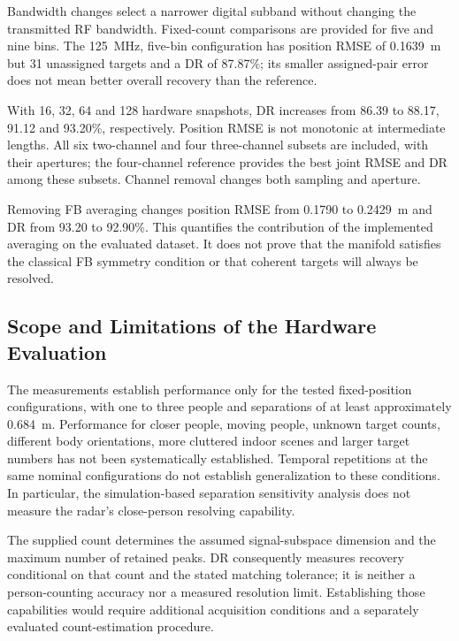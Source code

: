 Bandwidth changes select a narrower digital subband without changing the transmitted RF bandwidth. Fixed-count comparisons are provided for five and nine bins. The 125~MHz, five-bin configuration has position RMSE of 0.1639~m but 31 unassigned targets and a DR of 87.87\%; its smaller assigned-pair error does not mean better overall recovery than the reference.

With 16, 32, 64 and 128 hardware snapshots, DR increases from 86.39 to 88.17, 91.12 and 93.20\%, respectively. Position RMSE is not monotonic at intermediate lengths. All six two-channel and four three-channel subsets are included, with their apertures; the four-channel reference provides the best joint RMSE and DR among these subsets. Channel removal changes both sampling and aperture.

Removing FB averaging changes position RMSE from 0.1790 to 0.2429~m and DR from 93.20 to 92.90\%. This quantifies the contribution of the implemented averaging on the evaluated dataset. It does not prove that the manifold satisfies the classical FB symmetry condition or that coherent targets will always be resolved.



\subsection{Scope and Limitations of the Hardware Evaluation}
\label{subsec:limitations}
The measurements establish performance only for the tested fixed-position configurations, with one to three people and separations of at least approximately 0.684~m. Performance for closer people, moving people, unknown target counts, different body orientations, more cluttered indoor scenes and larger target numbers has not been systematically established. Temporal repetitions at the same nominal configurations do not establish generalization to these conditions. In particular, the simulation-based separation sensitivity analysis does not measure the radar's close-person resolving capability.

The supplied count determines the assumed signal-subspace dimension and the maximum number of retained peaks. DR consequently measures recovery conditional on that count and the stated matching tolerance; it is neither a person-counting accuracy nor a measured resolution limit. Establishing those capabilities would require additional acquisition conditions and a separately evaluated count-estimation procedure.
